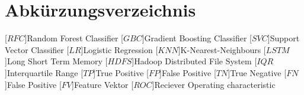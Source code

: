 \clearpage
\chapter*{Abkürzungsverzeichnis}\label{abkuerzungsverzeichnis}
\begin{acronym}[YTM]
\setlength{\itemsep}{-\parsep}

[$RFC$]{\hspace{1cm}Random Forest Classifier}
[$GBC$]{\hspace{1cm}Gradient Boosting Classifier}
[$SVC$]{\hspace{1cm}Support Vector Classifier}
[$LR$]{\hspace{1cm}Logistic Regression}
[$KNN$]{\hspace{0.825cm}K-Nearest-Neighbours}
[$LSTM$]{\hspace{0.625cm}Long Short Term Memory}
[$HDFS$]{\hspace{0.625cm}Hadoop Distributed File System}
[$IQR$]{\hspace{1cm}Interquartile Range}
[$TP$]{\hspace{1cm}True Positive}
[$FP$]{\hspace{1cm}False Positive}
[$TN$]{\hspace{1cm}True Negative}
[$FN$]{\hspace{1cm}False Positive}
[$FV$]{\hspace{1cm}Feature Vektor}
[$ROC$]{\hspace{1cm}Reciever Operating characteristic}






\end{acronym}